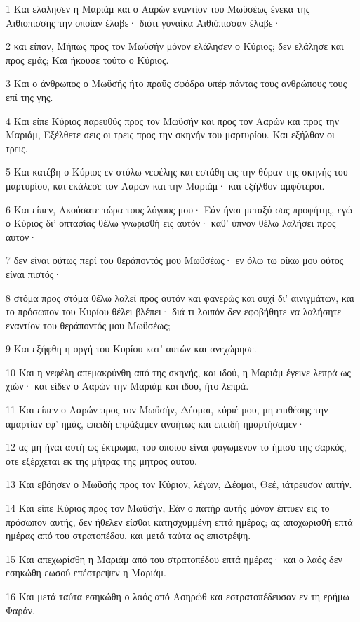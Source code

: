 \par 1 Και ελάλησεν η Μαριάμ και ο Ααρών εναντίον του Μωϋσέως ένεκα της Αιθιοπίσσης την οποίαν έλαβε· διότι γυναίκα Αιθιόπισσαν έλαβε·
\par 2 και είπαν, Μήπως προς τον Μωϋσήν μόνον ελάλησεν ο Κύριος; δεν ελάλησε και προς εμάς; Και ήκουσε τούτο ο Κύριος.
\par 3 Και ο άνθρωπος ο Μωϋσής ήτο πραΰς σφόδρα υπέρ πάντας τους ανθρώπους τους επί της γης.
\par 4 Και είπε Κύριος παρευθύς προς τον Μωϋσήν και προς τον Ααρών και προς την Μαριάμ, Εξέλθετε σεις οι τρεις προς την σκηνήν του μαρτυρίου. Και εξήλθον οι τρεις.
\par 5 Και κατέβη ο Κύριος εν στύλω νεφέλης και εστάθη εις την θύραν της σκηνής του μαρτυρίου, και εκάλεσε τον Ααρών και την Μαριάμ· και εξήλθον αμφότεροι.
\par 6 Και είπεν, Ακούσατε τώρα τους λόγους μου· Εάν ήναι μεταξύ σας προφήτης, εγώ ο Κύριος δι' οπτασίας θέλω γνωρισθή εις αυτόν· καθ' ύπνον θέλω λαλήσει προς αυτόν·
\par 7 δεν είναι ούτως περί του θεράποντός μου Μωϋσέως· εν όλω τω οίκω μου ούτος είναι πιστός·
\par 8 στόμα προς στόμα θέλω λαλεί προς αυτόν και φανερώς και ουχί δι' αινιγμάτων, και το πρόσωπον του Κυρίου θέλει βλέπει· διά τι λοιπόν δεν εφοβήθητε να λαλήσητε εναντίον του θεράποντός μου Μωϋσέως;
\par 9 Και εξήφθη η οργή του Κυρίου κατ' αυτών και ανεχώρησε.
\par 10 Και η νεφέλη απεμακρύνθη από της σκηνής, και ιδού, η Μαριάμ έγεινε λεπρά ως χιών· και είδεν ο Ααρών την Μαριάμ και ιδού, ήτο λεπρά.
\par 11 Και είπεν ο Ααρών προς τον Μωϋσήν, Δέομαι, κύριέ μου, μη επιθέσης την αμαρτίαν εφ' ημάς, επειδή επράξαμεν ανοήτως και επειδή ημαρτήσαμεν·
\par 12 ας μη ήναι αυτή ως έκτρωμα, του οποίου είναι φαγωμένον το ήμισυ της σαρκός, ότε εξέρχεται εκ της μήτρας της μητρός αυτού.
\par 13 Και εβόησεν ο Μωϋσής προς τον Κύριον, λέγων, Δέομαι, Θεέ, ιάτρευσον αυτήν.
\par 14 Και είπε Κύριος προς τον Μωϋσήν, Εάν ο πατήρ αυτής μόνον έπτυεν εις το πρόσωπον αυτής, δεν ήθελεν είσθαι κατησχυμμένη επτά ημέρας; ας αποχωρισθή επτά ημέρας από του στρατοπέδου, και μετά ταύτα ας επιστρέψη.
\par 15 Και απεχωρίσθη η Μαριάμ από του στρατοπέδου επτά ημέρας· και ο λαός δεν εσηκώθη εωσού επέστρεψεν η Μαριάμ.
\par 16 Και μετά ταύτα εσηκώθη ο λαός από Ασηρώθ και εστρατοπέδευσαν εν τη ερήμω Φαράν.

